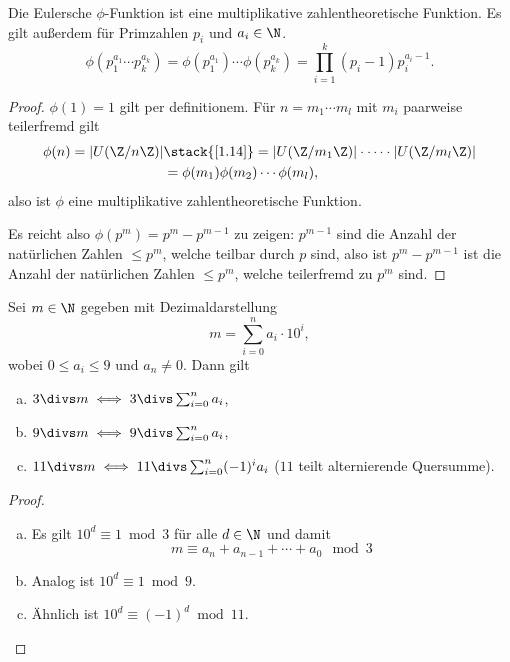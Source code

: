 \begin{kor} \label{1.15}
	Die Eulersche $\phi$-Funktion ist eine multiplikative zahlentheoretische Funktion.
	Es gilt außerdem für Primzahlen $p_i$ und $a_i \in \N$.
	\[
		\phi( p_1^{a_1} \dotsb p_k^{a_k} )
		=\phi( p_1^{a_1}) \dotsb \phi(p_k^{a_k})
		= \prod_{i=1}^k (p_i - 1) p_i^{a_i - 1}.
	\]
	\begin{proof}
		$\phi(1) = 1$ gilt per definitionem.
		Für $n = m_1 \dotsb m_l$ mit $m_i$ paarweise teilerfremd gilt
		\begin{align*}
			\phi(n)
			= | U(\Z / n\Z) |
			&\stack{\ref{1.14}}= |U(\Z /m _1 \Z) | \cdot \dotsb \cdot | U(\Z /m_l \Z) | \\
			&= \phi(m_1)\phi(m_2) \dotsb \phi(m_l),
		\end{align*}
		also ist $\phi$ eine multiplikative zahlentheoretische Funktion.

		Es reicht also $\phi(p^m) = p^m - p^{m-1}$ zu zeigen:
		$p^{m-1}$ sind die Anzahl der natürlichen Zahlen $\le p^m$, welche teilbar durch $p$ sind,
		also ist $p^m - p^{m-1}$ ist die Anzahl der natürlichen Zahlen $\le p^m$, welche teilerfremd zu $p^m$ sind.
	\end{proof}
\end{kor}

\begin{st}[Teilbarkeitskriterien] \label{1.16}
	Sei $m \in \N$ gegeben mit Dezimaldarstellung
	\[
		m = \sum_{i=0}^n a_i \cdot 10^i,
	\]
	wobei $0 \le a_i \le 9$ und $a_n \neq 0$.
	Dann gilt
	\begin{enumerate}[a)]
		\item
			$3 \divs m \iff 3 \divs \sum_{i=0}^n a_i$,
		\item
			$9 \divs m \iff 9 \divs \sum_{i=0}^n a_i$,
		\item
			$11 \divs m \iff 11 \divs \sum_{i=0}^n (-1)^i a_i$ ($11$ teilt alternierende Quersumme).
	\end{enumerate}
	\begin{proof}
		\begin{enumerate}[a)]
			\item
				Es gilt $10^d \equiv 1 \bmod 3$ für alle $d \in \N$ und damit
				\[
					m \equiv a_n + a_{n-1} + \dotsb + a_0 \mod 3
				\]
			\item
				Analog ist $10^d \equiv 1 \bmod 9$.
			\item
				Ähnlich ist $10^d \equiv (-1)^d \bmod 11$.
		\end{enumerate}
	\end{proof}
\end{st}

